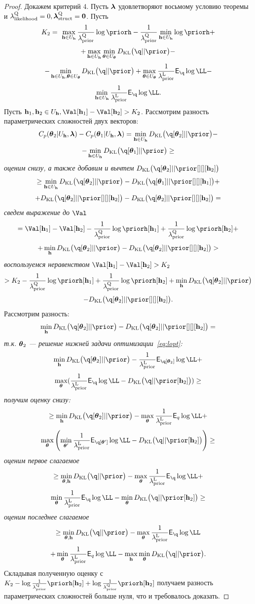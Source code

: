 \begin{proof}
Докажем критерий 4. 
Пусть $\boldsymbol{\lambda}$ удовлетворяют восьмому условию теоремы и $\lambda_\text{likelihood}^\text{Q} = 0, \boldsymbol{\lambda}_\text{struct}^\text{Q} = \mathbf{0}$.
Пусть 
\[
K_2 =  \max_{\h \in \Uh} \frac{1}{\lamCQ}\log \priorh  - \frac{1}{\lamCQ}\min_{\h \in \Uh} \log \priorh +
\]
\[
+ \max_{\h \in \Uh} \min_{\teta \in \Uteta} \KL{\q}{\prior} - 
\]
\[
- \min_{\h \in \Uh, \teta \in \Uteta} \KL{\q}{\prior} + \max_{\teta \in \Uteta} \frac{1}{\lamCL} \E_{\q}\log \LL - 
\]
\[
\min_{\h \in \Uh} \frac{1}{\lamCL} \E_{\q} \log \LL.
\]
Пусть $\h_1, \h_2 \in \Uh, \Val[\h_1] - \Val[\h_2]>K_2$.
Рассмотрим разность параметрических сложностей двух векторов:
\[
C_p(\teta_2|\Uh, \lam) - C_p(\teta_1|\Uh, \lam) = \min_{\h \in \Uh} \KL{\q[\teta_2]}{\prior} - 
\]
\[
 - \min_{\h \in \Uh}\KL{\q[\teta_1]}{\prior} \geq
\]
\textit{оценим снизу, а также добавим и вычтем }$\KL{\q[\teta_2]}{\prior[][][\h_2]}$
\[
\geq   \min_{\h \in \Uh} \KL{\q[\teta_2]}{\prior} - \KL{\q[\teta_1]}{\prior[][][\h_1]} +
\]
\[
+ \KL{\q[\teta_2]}{\prior[][][\h_2]} - \KL{\q[\teta_2]}{\prior[][][\h_2]} = 
\]
\textit{сведем выражение до }$\Val$
\[
= \Val[\h_1] - \Val[\h_2] - \frac{1}{\lamCQ}\log\priorh[\h_1] + \frac{1}{\lamCQ}\log\priorh[\h_2]  +
\]
\[
+  \min_{\h}\KL{\q[\teta_2]}{\prior}  -  \KL{\q[\teta_2]}{\prior[][][\h_2]} >
\]
\textit{воспользуемся неравенством }$\Val[\h_1] - \Val[\h_2]>K_2$
\[
> K_2 - \frac{1}{\lamCQ}\log\priorh[\h_1] + \frac{1}{\lamCQ}\log \priorh[\h_2] + \min_{\h}\KL{\q[\teta_2]}{\prior} 
\]
\[
 -  \KL{\q[\teta_2]}{\prior[][][\h_2]}.
\]
Рассмотрим разность:
\[
\min_{\h}\KL{\q[\teta_2]}{\prior}  -  \KL{\q[\teta_2]}{\prior[][][\h_2]}  =
\] 
\textit{т.к. }$\boldsymbol{\theta}_2$ \textit{--- решение нижней задачи оптимизации~\eqref{eq:lopt}:}
\[
\min_{\h}\KL{\q[\teta_2]}{\prior}  - \frac{1}{\lamCL}\E_{\q[\teta_2]}\log \LL + 
\]
\[
\max_{\teta} (\frac{1}{\lamCL} \E_{\q}\log \LL - \KL{\q}{\prior[\h_2]}) \geq
\]
\textit{получим оценку снизу:}
\[
\geq \min_{\h}\KL{\q[\teta_2]}{\prior} - \max_{\teta}\frac{1}{\lamCL}\E_{q} \log \LL + 
\]
\[
    \max_{\teta}\left(\min_{\teta'} \frac{1}{\lamCL} \E_{\q[\teta']} \log \LL - \KL{\q}{\prior[\h_2]} \right) \geq
\]
\textit{оценим первое слагаемое}
\[
\geq \min_{\teta,\h} \KL{\q}{\prior} - \max_{\teta}\frac{1}{\lamCL}\E_{\q} \log \LL +
\]
\[
\min_{\teta} \frac{1}{\lamCL} \E_{\q} \log \LL - \min_{\teta}\KL{\q}{\prior[\h_2]} \geq
\]
\textit{оценим последнее слагаемое}
\[
\geq \min_{\teta, \h} \KL{\q}{\prior} - \max_{\teta}\frac{1}{\lamCL} \E_{\q} \log \LL 
\]
\[
+ \min_{\teta}\frac{1}{\lamCL}\E_{q} \log \LL - \max_{\h}\min_{\teta}\KL{\q}{\prior}.
\]
Складывая полученную оценку с $K_2 -\log \frac{1}{\lamCQ}\priorh[\h_2] + \log \frac{1}{\lamCQ}\priorh[\h_2]$ получаем разность параметрических сложностей больше нуля, что и требовалось доказать.


\end{proof}
